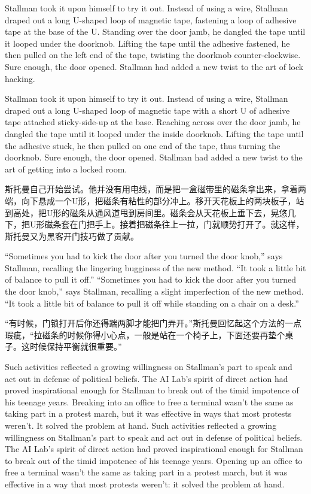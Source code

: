 \ifdefined\eng
\ifdefined\vone
Stallman took it upon himself to try it out. Instead of using a wire, Stallman draped out a long U-shaped loop of magnetic tape, fastening a loop of adhesive tape at the base of the U. Standing over the door jamb, he dangled the tape until it looped under the doorknob. Lifting the tape until the adhesive fastened, he then pulled on the left end of the tape, twisting the doorknob counter-clockwise. Sure enough, the door opened. Stallman had added a new twist to the art of lock hacking.
\if

\ifdefined\vtwo
Stallman took it upon himself to try it out. Instead of using a wire, Stallman draped out a long U-shaped loop of magnetic tape with a short U of adhesive tape attached sticky-side-up at the base. Reaching across over the door jamb, he dangled the tape until it looped under the inside doorknob. Lifting the tape until the adhesive stuck, he then pulled on one end of the tape, thus turning the doorknob. Sure enough, the door opened. Stallman had added a new twist to the art of getting into a locked room.
\fi
\fi

\ifdefined\chs
斯托曼自己开始尝试。他并没有用电线，而是把一盒磁带里的磁条拿出来，拿着两端，向下悬成一个U形，把磁条有粘性的部分冲上。移开天花板上的两块板子，站到高处，把U形的磁条从通风道甩到房间里。磁条会从天花板上垂下去，晃悠几下，把U形磁条套在门把手上。接着把磁条往上一拉，门就顺势打开了。就这样，斯托曼又为黑客开门技巧做了贡献。
\fi

\ifdefined\eng
\ifdefined\vone
``Sometimes you had to kick the door after you turned the door knob,'' says Stallman, recalling the lingering bugginess of the new method. ``It took a little bit of balance to pull it off.''
\fi
\ifdefined\vtwo
``Sometimes you had to kick the door after you turned the door knob,'' says Stallman, recalling a slight imperfection of the new method. ``It took a little bit of balance to pull it off while standing on a chair on a desk.''
\fi
\fi

\ifdefined\chs
``有时候，门锁打开后你还得踹两脚才能把门弄开。''斯托曼回忆起这个方法的一点瑕疵，``拉磁条的时候你得小心点，一般是站在一个椅子上，下面还要再垫个桌子。这时候保持平衡就很重要。''
\fi

\ifdefined\eng
\ifdefined\vone
Such activities reflected a growing willingness on Stallman's part to speak and act out in defense of political beliefs. The AI Lab's spirit of direct action had proved inspirational enough for Stallman to break out of the timid impotence of his teenage years. Breaking into an office to free a terminal wasn't the same as taking part in a protest march, but it was effective in ways that most protests weren't. It solved the problem at hand.
\fi
\ifdefined\vtwo
Such activities reflected a growing willingness on Stallman's part to speak and act out in defense of political beliefs. The AI Lab's spirit of direct action had proved inspirational enough for Stallman to break out of the timid impotence of his teenage years. Opening up an office to free a terminal wasn't the same as taking part in a protest march, but it was effective in a way that most protests weren't: it solved the problem at hand.
\fi
\fi


